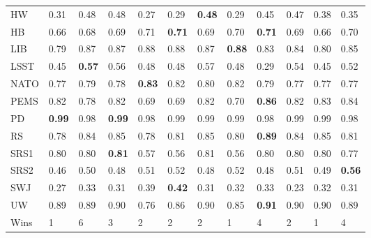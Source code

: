 \begin{table}
\begin{tabular}{l*{11}{p{0.5cm}}}
     HW &          0.31 &          0.48 &          0.48 &          0.27 &          0.29 & \textbf{0.48} &          0.29 &          0.45 &          0.47 &          0.38 &          0.35 \\
     HB &          0.66 &          0.68 &          0.69 &          0.71 & \textbf{0.71} &          0.69 &          0.70 & \textbf{0.71} &          0.69 &          0.66 &          0.70 \\
    LIB &          0.79 &          0.87 &          0.87 &          0.88 &          0.88 &          0.87 & \textbf{0.88} &          0.83 &          0.84 &          0.80 &          0.85 \\
   LSST &          0.45 & \textbf{0.57} &          0.56 &          0.48 &          0.48 &          0.57 &          0.48 &          0.29 &          0.54 &          0.45 &          0.52 \\
   NATO &          0.77 &          0.79 &          0.78 & \textbf{0.83} &          0.82 &          0.80 &          0.82 &          0.79 &          0.77 &          0.77 &          0.77 \\
   PEMS &          0.82 &          0.78 &          0.82 &          0.69 &          0.69 &          0.82 &          0.70 & \textbf{0.86} &          0.82 &          0.83 &          0.84 \\
     PD & \textbf{0.99} &          0.98 & \textbf{0.99} &          0.98 &          0.99 &          0.99 &          0.99 &          0.98 &          0.99 &          0.99 &          0.98 \\
     RS &          0.78 &          0.84 &          0.85 &          0.78 &          0.81 &          0.85 &          0.80 & \textbf{0.89} &          0.84 &          0.85 &          0.81 \\
   SRS1 &          0.80 &          0.80 & \textbf{0.81} &          0.57 &          0.56 &          0.81 &          0.56 &          0.80 &          0.80 &          0.80 &          0.77 \\
   SRS2 &          0.46 &          0.50 &          0.48 &          0.51 &          0.52 &          0.48 &          0.52 &          0.48 &          0.51 &          0.49 & \textbf{0.56} \\
    SWJ &          0.27 &          0.33 &          0.31 &          0.39 & \textbf{0.42} &          0.31 &          0.32 &          0.33 &          0.23 &          0.32 &          0.31 \\
     UW &          0.89 &          0.89 &          0.90 &          0.76 &          0.86 &          0.90 &          0.85 & \textbf{0.91} &          0.90 &          0.90 &          0.89 \\
   Wins &             1 &             6 &             3 &             2 &             2 &             2 &             1 &             4 &             2 &             1 &             4 \\
\bottomrule
\end{tabular}
\end{table}
